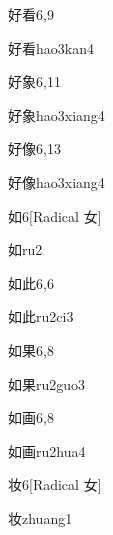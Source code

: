 \begin{entry}{好看}{6,9}
  \begin{phonetics}{好看}{hao3kan4}
  \end{phonetics}
\end{entry}

\begin{entry}{好象}{6,11}
  \begin{phonetics}{好象}{hao3xiang4}
  \end{phonetics}
\end{entry}

\begin{entry}{好像}{6,13}
  \begin{phonetics}{好像}{hao3xiang4}
  \end{phonetics}
\end{entry}

\begin{entry}{如}{6}[Radical 女]
  \begin{phonetics}{如}{ru2}
  \end{phonetics}
\end{entry}

\begin{entry}{如此}{6,6}
  \begin{phonetics}{如此}{ru2ci3}
  \end{phonetics}
\end{entry}

\begin{entry}{如果}{6,8}
  \begin{phonetics}{如果}{ru2guo3}
  \end{phonetics}
\end{entry}

\begin{entry}{如画}{6,8}
  \begin{phonetics}{如画}{ru2hua4}
  \end{phonetics}
\end{entry}

\begin{entry}{妆}{6}[Radical 女]
  \begin{phonetics}{妆}{zhuang1}
  \end{phonetics}
\end{entry}

